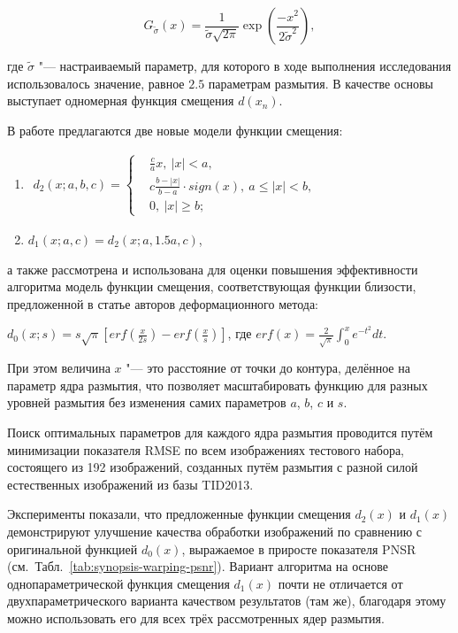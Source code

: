 \begin{equation*}
	G_{\widetilde{\sigma}}\left(x\right) = \frac{1}{\widetilde{\sigma} \sqrt{2\pi}} \exp\left(\frac{-x^2}{2\widetilde{\sigma}^2}\right),
\end{equation*}

\noindent где $\widetilde{\sigma}$ "--- настраиваемый параметр, для которого в ходе выполнения исследования использовалось значение, равное $2.5$ параметрам размытия. В качестве основы выступает одномерная функция смещения $d\left(x_n\right)$.

В работе предлагаются две новые модели функции смещения:

\begin{enumerate}[beginpenalty=10000]	
	\item
	$
	\begin{aligned}
		d_2\left(x; a, b, c\right)=\left\{
		\begin{aligned}
			&\frac{c}{a}x,\ \left|x\right|<a,\\
			&c\frac{b-\left|x\right|}{b-a} \cdot sign\left(x\right),\ a\le\left|x\right|<b,\\
			&0,\ \left|x\right|\geq b;
		\end{aligned}
		\right.
	\end{aligned}
	$
	
	\item $d_1\left(x; a, c\right) = d_2\left(x; a, 1.5a, c\right)$,
\end{enumerate}

\noindent а также рассмотрена и использована для оценки повышения эффективности алгоритма модель функции смещения, соответствующая функции близости, предложенной в статье авторов деформационного метода:

$d_0\left(x; s\right)=s\sqrt\pi\left[erf\left(\frac{x}{2s}\right)-erf\left(\frac{x}{s}\right)\right]$, где $erf{\left(x\right)}=\frac{2}{\sqrt\pi}\int_{0}^{x}{e^{-t^2}dt}$.

При этом величина $x$ "--- это расстояние от точки до контура, делённое на параметр ядра размытия, что позволяет масштабировать функцию для разных уровней размытия без изменения самих параметров $a$, $b$, $c$ и $s$.

Поиск оптимальных параметров для каждого ядра размытия проводится путём минимизации показателя RMSE по всем изображениях тестового набора, состоящего из 192 изображений, созданных путём размытия с разной силой естественных изображений из базы TID2013.

Эксперименты показали, что предложенные функции смещения $d_2\left(x\right)$ и $d_1\left(x\right)$ демонстрируют улучшение качества обработки изображений по сравнению с оригинальной функцией $d_0\left(x\right)$, выражаемое в приросте показателя PNSR (см.~Табл.~\ref{tab:synopsis-warping-psnr}).
Вариант алгоритма на основе однопараметрической функция смещения $d_1\left(x\right)$ почти не отличается от двухпараметрического варианта качеством результатов (там же), благодаря этому можно использовать его для всех трёх рассмотренных ядер размытия.

